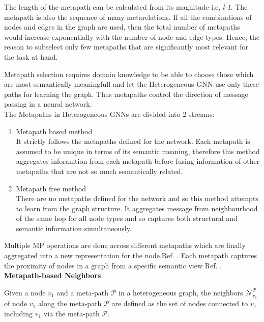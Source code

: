 \documentclass{report} %
\begin{document}
The length of the metapath can be calculated from its magnitude i.e, \textit{l-1}. 
The metapath is also the sequence of many metarelations.  If all the combinations of nodes and edges in the graph are used, then the total number of metapaths would 
increase exponentially with the number of node and edge types. Hence, the reason to subselect only few metapaths that are significantly most relevant for the task at hand. 

Metapath selection requires domain knowledge to be able to choose those which are most semantically meaningfull and let the Heterogeneous \ac{GNN} use only these paths 
for learning the graph.  Thus metapaths control the direction of message passing in a neural network.\\

The Metapaths in Heterogeneous \ac{GNN}s are divided into 2 streams:
\begin{enumerate}[nosep]
    \item Metapath based method\\
    It strictly follows the metapaths defined for the network.
    Each metapath is assumed to be unique in terms of its semantic meaning, therefore this method aggregates inforamtion from each metapath before fusing 
    information of other metapaths that are not so much semantically related.
    \item Metapath free method\\
    There are no metapaths defined for the network and so this method attempts to learn from the graph structure.
    It aggregates message from neighbourhood of the same hop for all node types and so captures both structural and semantic information simultaneously.
\end{enumerate}

Multiple \ac{MP} operations are done across different metapaths which are finally aggregated into a new representation for the node.Ref. \cite{ML HGNN-2023}.
Each metapath captures the proximity of nodes in a graph from a specific semantic view Ref. \cite{HGNN-2020}. \\

\textbf{Metapath-based Neighbors}

Given a node $v_1$ and a meta-path $\mathcal{P}$ in a heterogeneous graph, the neighbors \( \mathcal{N}_{v_1}^{\mathcal{P}} \) of 
node $v_1$ along the meta-path $\mathcal{P}$ are defined as the set of nodes connected to $ v_1$ including $v_1$ via the meta-path $\mathcal{P}$. \\
\end{document}
